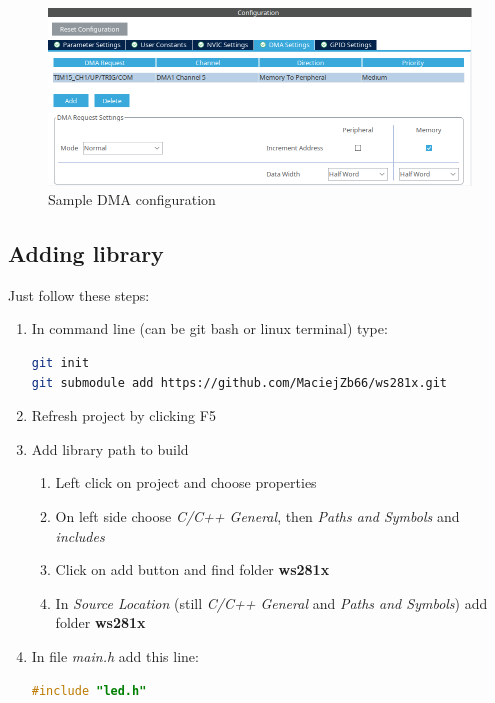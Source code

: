 \documentclass[]{article}
\begin{document}
	\begin{minipage}{0.5\textwidth}
		\begin{figure}[H]
			\centering
			\includegraphics[width=0.9\linewidth]{dma}
			\caption{Sample DMA configuration}
			\label{fig:dma}
		\end{figure}		
	\end{minipage}
	\subsection{Adding library}
	Just follow these steps:
	\begin{enumerate}
		 \item In command line (can be git bash or linux terminal) type:\\
			\begin{lstlisting}[language=bash]
git init
git submodule add https://github.com/MaciejZb66/ws281x.git
\end{lstlisting}
		\item Refresh project by clicking F5
		\item Add library path to build
		\begin{enumerate}[label*=\arabic*.]
			\item Left click on project and choose properties
			\item On left side choose \textit{C/C++ General}, then \textit{Paths and Symbols} and \textit{includes}
			\item Click on add button and find folder \textbf{ws281x}
			\item In \textit{Source Location} (still \textit{C/C++ General} and \textit{Paths and Symbols}) add folder \textbf{ws281x}
		\end{enumerate}
		\item In file \textit{main.h} add this line:\\
			\begin{lstlisting}[language=C]
#include "led.h"
\end{lstlisting}
	\end{enumerate}
			
\end{document}
